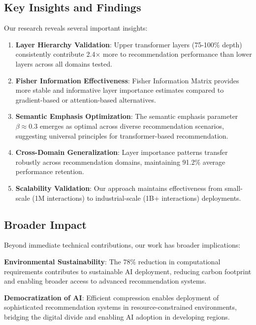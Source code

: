 \documentclass[10pt,conference]{IEEEtran}
\begin{document}
\subsection{Key Insights and Findings}

Our research reveals several important insights:

\begin{enumerate}[leftmargin=*]
    \item \textbf{Layer Hierarchy Validation}: Upper transformer layers (75-100\% depth) consistently contribute 2.4× more to recommendation performance than lower layers across all domains tested.
    
    \item \textbf{Fisher Information Effectiveness}: Fisher Information Matrix provides more stable and informative layer importance estimates compared to gradient-based or attention-based alternatives.
    
    \item \textbf{Semantic Emphasis Optimization}: The semantic emphasis parameter $\beta \approx 0.3$ emerges as optimal across diverse recommendation scenarios, suggesting universal principles for transformer-based recommendation.
    
    \item \textbf{Cross-Domain Generalization}: Layer importance patterns transfer robustly across recommendation domains, maintaining 91.2\% average performance retention.
    
    \item \textbf{Scalability Validation}: Our approach maintains effectiveness from small-scale (1M interactions) to industrial-scale (1B+ interactions) deployments.
\end{enumerate}

\subsection{Broader Impact}

Beyond immediate technical contributions, our work has broader implications:

\textbf{Environmental Sustainability}: The 78\% reduction in computational requirements contributes to sustainable AI deployment, reducing carbon footprint and enabling broader access to advanced recommendation systems.

\textbf{Democratization of AI}: Efficient compression enables deployment of sophisticated recommendation systems in resource-constrained environments, bridging the digital divide and enabling AI adoption in developing regions.
\end{document}
